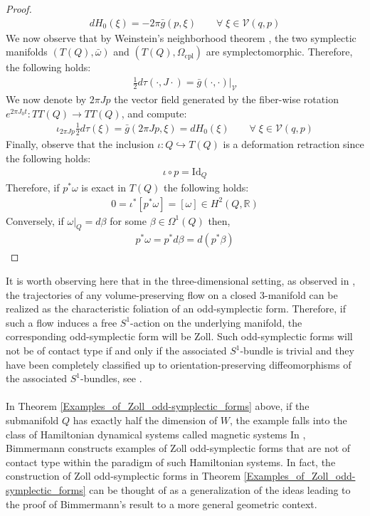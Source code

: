 \documentclass[11pt]{amsart}
\theoremstyle{plain}
\theoremstyle{definition}
\theoremstyle{remark}
\begin{document}
\begin{proof}
\begin{align}
    dH_0(\xi)=-2\pi \bar g(p,\xi) \qquad \forall\; \xi \in \mathcal{V}(q,p)
\end{align}
We now observe that by Weinstein's neighborhood theorem \cite[Theorem 3.4.10]{mcduffsalamon2017introduction}, the two symplectic manifolds $(T(Q),\bar \omega)$ and $(T(Q),\Omega_{\text{cpl}})$ are symplectomorphic. Therefore, the following holds:
\begin{align}
    \frac{1}{2}d\tau(\cdot,J\cdot) = \bar g(\cdot,\cdot)\big\vert_{\mathcal{V}}
\end{align}
We now denote by $2\pi Jp$ the vector field generated by the fiber-wise rotation $e^{2\pi J_0t}:TT(Q) \rightarrow TT(Q)$, and compute:
\begin{align}
    \iota_{2\pi Jp}\frac{1}{2}d\tau(\xi) = \bar g(2\pi Jp,\xi) = dH_0(\xi) \qquad \forall \; \xi \in \mathcal{V}(q,p)
\end{align}
Finally, observe that the inclusion $\iota: Q \hookrightarrow T(Q)$ is a deformation retraction since the following holds:
\begin{align}
    \iota \circ p = \text{Id}_Q
\end{align}
Therefore, if $p^*\omega$ is exact in $T(Q)$ the following holds:
\begin{align}
    0=\iota^*[p^*\omega]=[\omega] \in H^2(Q,\mathbb{R})
\end{align}
Conversely, if $\omega\vert_Q = d\beta $ for some $\beta \in \Omega^1(Q)$ then,
\begin{align}
    p^*\omega=p^*d\beta =d(p^*\beta)
\end{align}
\end{proof}
It is worth observing here that in the three-dimensional setting, as observed in \cite{rohil}, the trajectories of any volume-preserving flow on a closed $3$-manifold can be realized as the characteristic foliation of an odd-symplectic form. Therefore, if such a flow induces a free $S^1$-action on the underlying manifold, the corresponding odd-symplectic form will be Zoll. Such odd-symplectic forms will not be of contact type if and only if the associated $S^1$-bundle is trivial and they have been completely classified up to orientation-preserving diffeomorphisms of the associated $S^1$-bundles, see \cite[Proposition 1.11]{B-K-Odd_Symp}.\\
\\
In Theorem \ref{Examples_of_Zoll_odd-symplectic_forms} above, if the submanifold $Q$ has exactly half the dimension of $W$, the example falls into the class of Hamiltonian dynamical systems called magnetic systems In \cite[Theorem A \& Theorem B]{johanna_negative_curvature}, Bimmermann constructs examples of Zoll odd-symplectic forms that are not of contact type within the paradigm of such Hamiltonian systems. In fact, the construction of Zoll odd-symplectic forms in Theorem \ref{Examples_of_Zoll_odd-symplectic_forms} can be thought of as a generalization of the ideas leading to the proof of Bimmermann's result to a more general geometric context.
\end{document}
